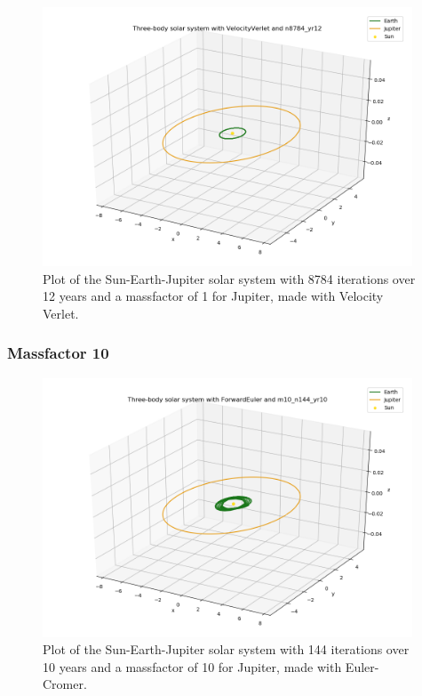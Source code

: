 \documentclass{article}
\begin{document}
    \begin{figure}[H]
        \centering
        \includegraphics[width = 11cm]{img/plot3D_S_E_J_V_n8784_yr12.png}
        \caption{Plot of the Sun-Earth-Jupiter solar system with 8784 iterations over 12 years and a massfactor of 1 for Jupiter, made with Velocity Verlet.}
        \label{fig:plot3D_S_E_J_V_n8784_yr12}
    \end{figure}

\subsubsection{Massfactor 10}

    \begin{figure}[H]
        \centering
        \includegraphics[width = 11cm]{img/plot3D_S_E_J_F_m10_n144_yr10.png}
        \caption{Plot of the Sun-Earth-Jupiter solar system with 144 iterations over 10 years and a massfactor of 10 for Jupiter, made with Euler-Cromer.}
        \label{fig:plot3D_S_E_J_F_m10_n144_yr10}
    \end{figure}
\end{document}
